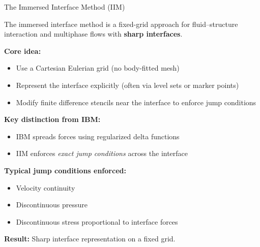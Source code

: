 \documentclass{beamer}
\begin{document}
\begin{frame}{The Immersed Interface Method (IIM)}
\footnotesize

The immersed interface method is a fixed-grid approach for
fluid--structure interaction and multiphase flows with \textbf{sharp interfaces}.

\medskip
\textbf{Core idea:}
\begin{itemize}
    \item Use a Cartesian Eulerian grid (no body-fitted mesh)
    \item Represent the interface explicitly (often via level sets or marker points)
    \item Modify finite difference stencils near the interface to enforce jump conditions
\end{itemize}

\medskip
\textbf{Key distinction from IBM:}
\begin{itemize}
    \item IBM spreads forces using regularized delta functions
    \item IIM enforces \emph{exact jump conditions} across the interface
\end{itemize}

\medskip
\textbf{Typical jump conditions enforced:}
\begin{itemize}
    \item Velocity continuity
    \item Discontinuous pressure
    \item Discontinuous stress proportional to interface forces
\end{itemize}

\medskip
\textbf{Result:} Sharp interface representation on a fixed grid.

\end{frame}
\end{document}
